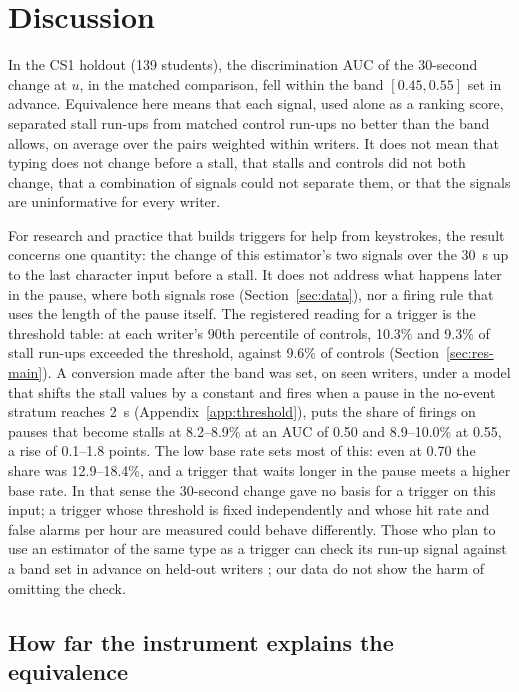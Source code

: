 \section{Discussion}
\label{sec:discussion}

In the CS1 holdout (139 students), the discrimination AUC of the 30-second change at $u$, in the matched comparison, fell
within the band $[0.45, 0.55]$ set in advance. Equivalence here
means that each signal, used alone as a ranking score, separated stall run-ups from matched control run-ups no better
than the band allows, on average over the pairs weighted within writers. It does not mean that typing does not change
before a stall, that stalls and controls did not both change, that a combination of signals could not separate them, or
that the signals are uninformative for every writer.

For research and practice that builds triggers for help from keystrokes, the result concerns one quantity: the change of
this estimator's two signals over the 30~s up to the last character input before a stall. It does not address what
happens later in the pause, where both signals rose (Section~\ref{sec:data}), nor a firing rule that uses the length of
the pause itself. The registered reading for a trigger is the threshold table: at each writer's 90th percentile of
controls, 10.3\% and 9.3\% of stall run-ups exceeded the threshold, against 9.6\% of controls (Section~\ref{sec:res-main}).
A conversion made after the band was set, on seen writers, under a model that shifts the stall values by a constant
and fires when a pause in the no-event stratum reaches 2~s (Appendix~\ref{app:threshold}), puts the share of firings
on pauses that become stalls at 8.2--8.9\% at an AUC of 0.50 and 8.9--10.0\% at 0.55, a rise of 0.1--1.8 points. The
low base rate sets most of this: even at 0.70 the share was 12.9--18.4\%, and a trigger that waits longer in the pause
meets a higher base rate. In that sense the 30-second change gave no basis for a trigger on this input; a trigger whose
threshold is fixed independently and whose hit rate and false alarms per hour are measured could behave differently. Those who plan to use an estimator of the same type as a trigger can
check its run-up signal against a band set in advance \cite{lakens2017equivalence} on held-out writers
\cite{gardner2018evaluating}; our data do not show the harm of omitting the check.

\subsection{How far the instrument explains the equivalence}

